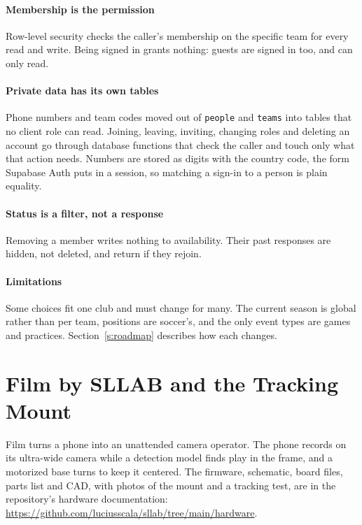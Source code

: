 \documentclass[letterpaper,11pt]{article}
\newcommand{\code}[1]{\texttt{#1}}
\begin{document}
\paragraph{Membership is the permission} Row-level security checks the caller's membership on
the specific team for every read and write. Being signed in grants nothing: guests are signed in
too, and can only read.

\paragraph{Private data has its own tables} Phone numbers and team codes moved out of
\code{people} and \code{teams} into tables that no client role can read. Joining, leaving,
inviting, changing roles and deleting an account go through database functions that check the
caller and touch only what that action needs. Numbers are stored as digits with the country code,
the form Supabase Auth puts in a session, so matching a sign-in to a person is plain equality.

\paragraph{Status is a filter, not a response} Removing a member writes nothing to availability.
Their past responses are hidden, not deleted, and return if they rejoin.

\paragraph{Limitations} Some choices fit one club and must change for many. The current season is
global rather than per team, positions are soccer's, and the only event types are games and
practices. Section~\ref{s:roadmap} describes how each changes.

\section{Film by SLLAB and the Tracking Mount}\label{s:film}

Film turns a phone into an unattended camera operator. The phone records on its ultra-wide
camera while a detection model finds play in the frame, and a motorized base turns to keep it
centered. The firmware, schematic, board files, parts list and CAD, with photos of the mount and
a tracking test, are in the repository's hardware documentation:
\url{https://github.com/luciusscala/sllab/tree/main/hardware}.
\end{document}

